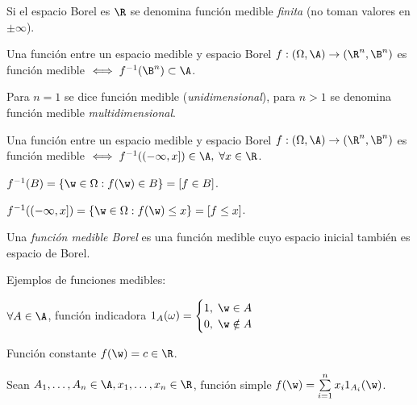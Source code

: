 \begin{nota}
  Si el espacio Borel es $\R$ se denomina función medible \emph{finita} (no toman valores en $\pm \infty$).
\end{nota}

\begin{nprop}
  Una función entre un espacio medible y espacio Borel $f : (\Omega, \A) \to (\R^n, \B^n)$ es función medible $\iff f^{-1}(\B^n) \subset \A$.
\end{nprop}

\begin{nota}
  Para $n = 1$ se dice función medible (\emph{unidimensional}), para $n>1$ se denomina función medible \emph{multidimensional}.
\end{nota}

\begin{nprop}
  Una función entre un espacio medible y espacio Borel $f : (\Omega, \A) \to (\R^n, \B^n)$ es función medible $\iff f^{-1}((-\infty, x]) \in \A, \; \forall x \in \R$.
\end{nprop}

\begin{nota}
  $f^{-1}(B) = \{ \w \in \Omega : f(\w) \in B \} = [f \in B]$.

  $f^{-1}((-\infty, x]) = \{ \w \in \Omega : f(\w) \leq x \} = [f \leq x]$.
\end{nota}

\begin{ndef}
  Una \emph{función medible Borel} es una función medible cuyo espacio inicial también es espacio de Borel.
\end{ndef}

Ejemplos de funciones medibles:

\begin{ejemplo}
  $\forall A \in \A$, función indicadora $1_A(\omega) =
    \begin{cases}
      1, \; \w \in A \\
      0, \; \w \notin A
    \end{cases}$
\end{ejemplo}

\begin{ejemplo}
  Función constante $f(\w) = c \in \R$.
\end{ejemplo}

\begin{ejemplo}
  Sean $A_1, \ldots, A_n \in \A, x_1, \ldots, x_n \in \R$, función simple $f(\w) = \sum \limits^n_{i = 1} x_i 1_{A_i}(\w)$.
\end{ejemplo}

